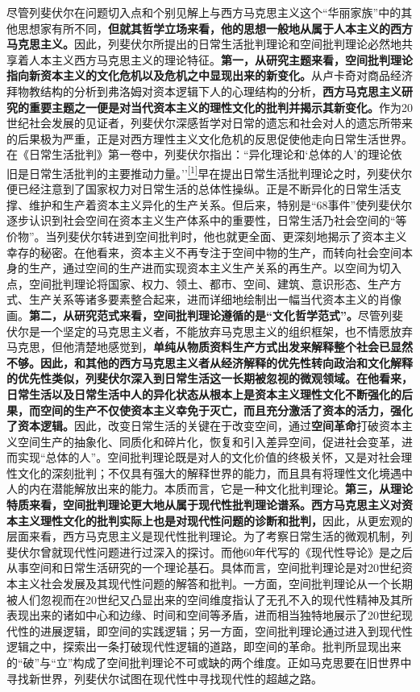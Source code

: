 \documentclass[UTF8, fontset = sourcesans, a4paper, oneside, zihao =
-4, scheme=chinese, no-math, space=true]{ctexbook}
\begin{document}
尽管列斐伏尔在问题切入点和个别见解上与西方马克思主义这个``华丽家族''中的其他思想家有所不同，\textbf{但就其哲学立场来看，他的思想一般地从属于人本主义的西方马克思主义。}因此，列斐伏尔所提出的日常生活批判理论和空间批判理论必然地共享着人本主义西方马克思主义的理论特征。\textbf{第一，从研究主题来看，空间批判理论指向新资本主义的文化危机以及危机之中显现出来的新变化。}从卢卡奇对商品经济拜物教结构的分析到弗洛姆对资本逻辑下人的心理结构的分析，\textbf{西方马克思主义研究的重要主题之一便是对当代资本主义的理性文化的批判并揭示其新变化。}作为20世纪社会发展的见证者，列斐伏尔深感哲学对日常的遗忘和社会对人的遗忘所带来的后果极为严重，正是对西方理性主义文化危机的反思促使他走向日常生活世界。在《日常生活批判》第一卷中，列斐伏尔指出：``异化理论和`总体的人'的理论依旧是日常生活批判的主要推动力量。''\protect\hypertarget{part0010_split_001.htmlux5cux23w1}{}{}\protect\hyperlink{part0010_split_002.htmlux5cux23m1}{\textsuperscript{{[}1{]}}}早在提出日常生活批判理论之时，列斐伏尔便已经注意到了国家权力对日常生活的总体性操纵。正是不断异化的日常生活支撑、维护和生产着资本主义异化的生产关系。但后来，特别是``68事件''使列斐伏尔逐步认识到社会空间在资本主义生产体系中的重要性，日常生活乃社会空间的``等价物''。当列斐伏尔转进到空间批判时，他也就更全面、更深刻地揭示了资本主义幸存的秘密。在他看来，资本主义不再专注于空间中物的生产，而转向社会空间本身的生产，通过空间的生产进而实现资本主义生产关系的再生产。以空间为切入点，空间批判理论将国家、权力、领土、都市、空间、建筑、意识形态、生产方式、生产关系等诸多要素整合起来，进而详细地绘制出一幅当代资本主义的肖像画。\textbf{第二，从研究范式来看，空间批判理论遵循的是``文化哲学范式''。}尽管列斐伏尔是一个坚定的马克思主义者，不能放弃马克思主义的组织框架，也不情愿放弃马克思，但他清楚地感觉到，\textbf{单纯从物质资料生产方式出发来解释整个社会已显然不够。因此，和其他的西方马克思主义者从经济解释的优先性转向政治和文化解释的优先性类似，列斐伏尔深入到日常生活这一长期被忽视的微观领域。在他看来，日常生活以及日常生活中人的异化状态从根本上是资本主义理性文化不断强化的后果，而空间的生产不仅使资本主义幸免于灭亡，而且充分激活了资本的活力，强化了资本逻辑。}因此，改变日常生活的关键在于改变空间，通过\textbf{空间革命}打破资本主义空间生产的抽象化、同质化和碎片化，恢复和引入差异空间，促进社会变革，进而实现``总体的人''。空间批判理论既是对人的文化价值的终极关怀，又是对社会理性文化的深刻批判；不仅具有强大的解释世界的能力，而且具有将理性文化境遇中人的内在潜能解放出来的能力。本质而言，它是一种文化批判理论。\textbf{第三，从理论特质来看，空间批判理论更大地从属于现代性批判理论谱系。西方马克思主义对资本主义理性文化的批判实际上也是对现代性问题的诊断和批判，}因此，从更宏观的层面来看，西方马克思主义是现代性批判理论。为了考察日常生活的微观机制，列斐伏尔曾就现代性问题进行过深入的探讨。而他60年代写的《现代性导论》是之后从事空间和日常生活研究的一个理论基石。具体而言，空间批判理论是对20世纪资本主义社会发展及其现代性问题的解答和批判。一方面，空间批判理论从一个长期被人们忽视而在20世纪又凸显出来的空间维度指认了无孔不入的现代性精神及其所表现出来的诸如中心和边缘、时间和空间等矛盾，进而相当独特地展示了20世纪现代性的进展逻辑，即空间的实践逻辑；另一方面，空间批判理论通过进入到现代性逻辑之中，探索出一条打破现代性逻辑的道路，即空间的革命。批判所显现出来的``破''与``立''构成了空间批判理论不可或缺的两个维度。正如马克思要在旧世界中寻找新世界，列斐伏尔试图在现代性中寻找现代性的超越之路。
\end{document}
